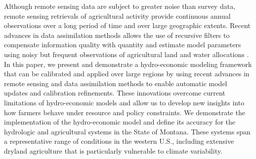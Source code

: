 Although remote sensing data are subject to greater noise than survey data, remote sensing retrievals of agricultural activity provide continuous annual observations over a long period of time and over large geographic extents. Recent advances in data assimilation methods allows the use of recursive filters to compensate information quality with quantity and estimate model parameters using noisy but frequent observations of agricultural land and water allocations \citep{Maneta2014}. In this paper, we present and demonstrate a hydro-economic modeling framework that can be calibrated and applied over large regions by using recent advances in remote sensing and data assimilation methods to enable automatic model updates and calibration refinements. These innovations overcome current limitations of hydro-economic models and allow us to develop new insights into how farmers behave under resource and policy constraints. We demonstrate the implementation of the hydro-economic model and define its accuracy for the hydrologic and agricultural systems in the State of Montana. These systems span a representative range of conditions in the western U.S., including extensive dryland agriculture that is particularly vulnerable to climate variability. 

